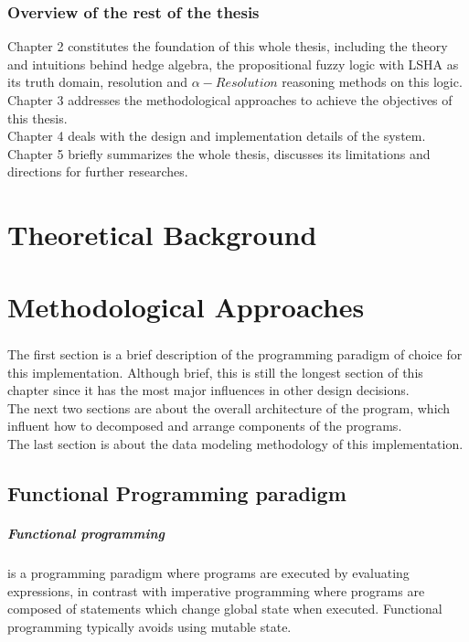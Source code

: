 \documentclass[../gr-final.tex]{subfiles}
\begin{document}
\subsection{Overview of the rest of the thesis}
Chapter 2 constitutes the foundation of this
whole thesis, including the theory and intuitions behind hedge
algebra, the propositional fuzzy logic with LSHA as its truth
domain, resolution and $\alpha-Resolution$ reasoning methods on
this logic.\\
Chapter 3 addresses the methodological approaches to achieve the
objectives of this thesis.\\
Chapter 4 deals with the design and implementation details of the
system.\\
Chapter 5 briefly summarizes the whole thesis, discusses its
limitations and directions for further researches.
\chapter{Theoretical Background}




\chapter{Methodological Approaches} 
\paragraph{} The first section is a brief description of the
programming paradigm of choice for this implementation. Although
brief, this is still the longest section of this chapter since
it has the most major influences in other design decisions.\\
The next two sections are about the overall architecture of the
program, which influent how to decomposed and arrange components
of the programs.\\
The last section is about the data modeling methodology of this
implementation. 
\section{Functional Programming paradigm}
\paragraph {Functional programming}is a programming paradigm where
programs are executed by evaluating expressions, in contrast with
imperative programming where programs are composed of statements
which change global state when executed. Functional programming
typically avoids using mutable state. 
\end{document}
